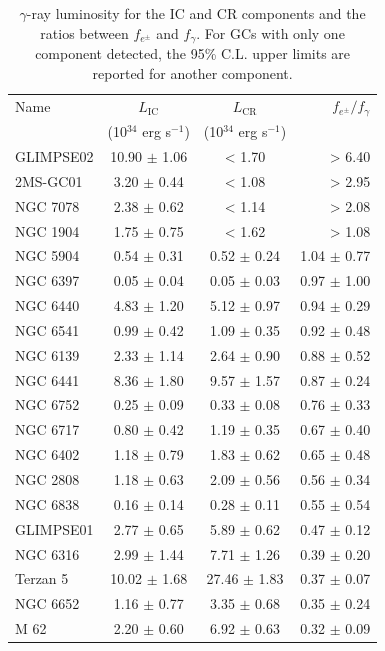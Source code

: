 \documentclass[doublespace,nopageskip]{VTthesis} %
\begin{document}
\begin{table}
    \centering
    \caption{$\gamma$-ray luminosity for the IC and CR  components and the ratios between $f_{e^\pm}$ and $f_\gamma$. For GCs with only one component detected, the 95\% C.L. upper limits are reported for another component.}
    \begin{tabular}{lccr}
\hline
Name & $L_\mathrm{{IC}}$ & $L_\mathrm{CR}$ & $f_{e^\pm}/f_\gamma$ \\
 & (10$^{34}$ erg s$^{-1}$) & (10$^{34}$ erg s$^{-1}$) &  \\
\hline
GLIMPSE02 & 10.90 $\pm$ 1.06 & < 1.70 & > 6.40 \\
2MS-GC01 & 3.20 $\pm$ 0.44 & < 1.08 & > 2.95 \\
NGC 7078 & 2.38 $\pm$ 0.62 & < 1.14 & > 2.08 \\
NGC 1904 & 1.75 $\pm$ 0.75 & < 1.62 & > 1.08 \\
NGC 5904 & 0.54 $\pm$ 0.31 & 0.52 $\pm$ 0.24 & 1.04 $\pm$ 0.77 \\
NGC 6397 & 0.05 $\pm$ 0.04 & 0.05 $\pm$ 0.03 & 0.97 $\pm$ 1.00 \\
NGC 6440 & 4.83 $\pm$ 1.20 & 5.12 $\pm$ 0.97 & 0.94 $\pm$ 0.29 \\
NGC 6541 & 0.99 $\pm$ 0.42 & 1.09 $\pm$ 0.35 & 0.92 $\pm$ 0.48 \\
NGC 6139 & 2.33 $\pm$ 1.14 & 2.64 $\pm$ 0.90 & 0.88 $\pm$ 0.52 \\
NGC 6441 & 8.36 $\pm$ 1.80 & 9.57 $\pm$ 1.57 & 0.87 $\pm$ 0.24 \\
NGC 6752 & 0.25 $\pm$ 0.09 & 0.33 $\pm$ 0.08 & 0.76 $\pm$ 0.33 \\
NGC 6717 & 0.80 $\pm$ 0.42 & 1.19 $\pm$ 0.35 & 0.67 $\pm$ 0.40 \\
NGC 6402 & 1.18 $\pm$ 0.79 & 1.83 $\pm$ 0.62 & 0.65 $\pm$ 0.48 \\
NGC 2808 & 1.18 $\pm$ 0.63 & 2.09 $\pm$ 0.56 & 0.56 $\pm$ 0.34 \\
NGC 6838 & 0.16 $\pm$ 0.14 & 0.28 $\pm$ 0.11 & 0.55 $\pm$ 0.54 \\
GLIMPSE01 & 2.77 $\pm$ 0.65 & 5.89 $\pm$ 0.62 & 0.47 $\pm$ 0.12 \\
NGC 6316 & 2.99 $\pm$ 1.44 & 7.71 $\pm$ 1.26 & 0.39 $\pm$ 0.20 \\
Terzan 5 & 10.02 $\pm$ 1.68 & 27.46 $\pm$ 1.83 & 0.37 $\pm$ 0.07 \\
NGC 6652 & 1.16 $\pm$ 0.77 & 3.35 $\pm$ 0.68 & 0.35 $\pm$ 0.24 \\
M 62 & 2.20 $\pm$ 0.60 & 6.92 $\pm$ 0.63 & 0.32 $\pm$ 0.09 \\

\end{tabular}
\end{table}
\end{document}

